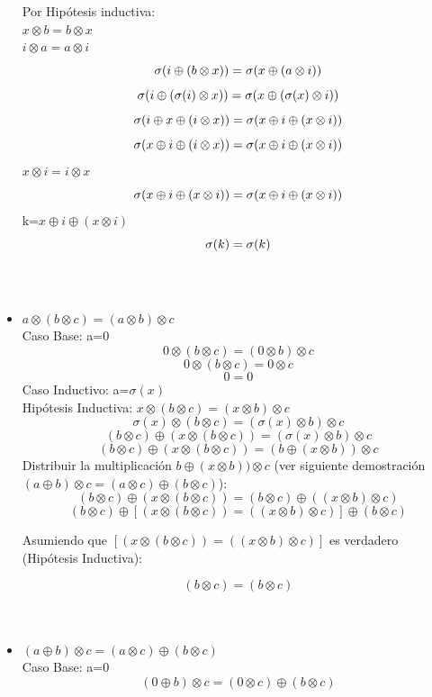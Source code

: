 \documentclass{article}
\begin{document}
\begin{itemize}
\[\]
Por Hipótesis inductiva:\\
$x \otimes b=b\otimes x$\\
$i \otimes a=a\otimes i$
\[
     \sigma(i\oplus (b \otimes x)) = \sigma(x\oplus(a \otimes i)) \\
\]
\[
     \sigma(i\oplus (\sigma(i) \otimes x)) = \sigma(x\oplus(\sigma(x) \otimes i)) \\
\]
\[
     \sigma(i\oplus x\oplus (i \otimes x)) = \sigma(x\oplus i \oplus (x \otimes i)) \\
\]
\[
     \sigma(x\oplus i\oplus (i \otimes x)) = \sigma(x\oplus i \oplus (x \otimes i)) \\
\]
$x\otimes i=i\otimes x$
\[
     \sigma(x\oplus i\oplus (x \otimes i)) = \sigma(x\oplus i \oplus (x \otimes i)) \\
\]
k=$x\oplus i\oplus (x \otimes i)$
\[
     \sigma(k) = \sigma(k) \\
\]
\\\\
        \item{$a \otimes (b \otimes c)=(a\otimes b)\otimes c$}\\
\large{Caso Base:}
a=0
\[
       0 \otimes (b \otimes c)=(0\otimes b)\otimes c
\]
\[
       0 \otimes (b \otimes c)=0\otimes c
\]
\[
       0=0 
\]
\large{Caso Inductivo:}
a=$\sigma(x)$\\
Hipótesis Inductiva:
$x \otimes (b \otimes c)=(x\otimes b)\otimes c$
\[
       \sigma(x) \otimes (b \otimes c)=(\sigma(x)\otimes b)\otimes c
\]
\[
       (b\otimes c)\oplus(x \otimes (b \otimes c))=(\sigma(x)\otimes b)\otimes c
\]
\[
       (b\otimes c)\oplus(x \otimes (b \otimes c))= (b\oplus (x\otimes b))\otimes c
\]
Distribuir la multiplicación $b\oplus (x\otimes b))\otimes c$ (ver siguiente demostración $(a\oplus b)\otimes c = (a\otimes c) \oplus (b \otimes c)$):
\[
       (b\otimes c)\oplus(x \otimes (b \otimes c))= (b\otimes c) \oplus ((x\otimes b)\otimes c)
\]
\[
       (b\otimes c)\oplus[(x \otimes (b \otimes c))= ((x\otimes b)\otimes c)]\oplus (b\otimes c)
\]
\begin{center}Asumiendo que $[(x \otimes (b \otimes c))= ((x\otimes b)\otimes c)]$ es verdadero (Hipótesis Inductiva):\end{center}
\[
       (b\otimes c)= (b\otimes c)
\]
\\\\
        \item{$(a\oplus b)\otimes c = (a\otimes c) \oplus (b \otimes c)$}\\
\large{Caso Base:}
a=0
\[
       (0\oplus b)\otimes c = (0\otimes c) \oplus (b \otimes c)
\]
\end{itemize}
\end{document}
